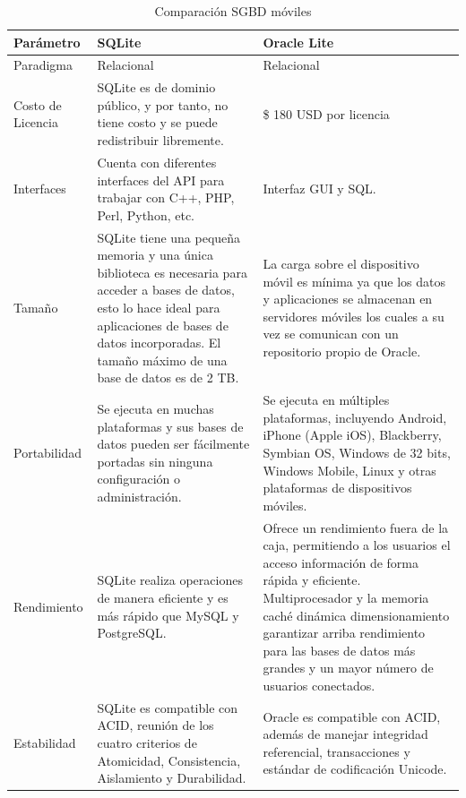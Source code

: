 \begin{table}[h!]
	\begin{center}
		\begin{tabular}{|p{3cm}|p{5.1cm}|p{5.1cm}|}
			\hline \rowcolor[RGB]{51,153,255} 
			\textcolor{blanco}{\bf Parámetro} &
				\textcolor{blanco}{\bf SQLite} &
				\textcolor{blanco}{\bf Oracle Lite} \\
			\hline 
				Paradigma &
				Relacional &
				Relacional \\
      		\hline \rowcolor[RGB]{240,248,255}
      			Costo de Licencia &
				SQLite es de dominio público, y por tanto, no tiene costo y se puede redistribuir libremente. &
				\$ 180 USD por licencia \\
      		\hline 
      			Interfaces &
				Cuenta con diferentes interfaces del API para trabajar con C++, PHP, Perl, Python, etc. &
				Interfaz GUI y SQL. \\
      		\hline \rowcolor[RGB]{240,248,255}
      			Tamaño &
				SQLite tiene una pequeña memoria y una única biblioteca es necesaria para acceder a bases de datos, esto lo hace ideal para aplicaciones de bases de datos incorporadas. El tamaño máximo de una base de datos es de 2 TB. &
				 La carga sobre el dispositivo móvil es mínima ya que los datos y aplicaciones se almacenan en servidores móviles los cuales a su vez se comunican con un repositorio propio de Oracle. \\
      		\hline 
      		Portabilidad &
      		Se ejecuta en muchas plataformas y sus bases de datos pueden ser fácilmente portadas sin ninguna configuración o administración. &
      		Se ejecuta en múltiples plataformas, incluyendo Android, iPhone (Apple iOS), Blackberry, Symbian OS, Windows de 32 bits, Windows Mobile, Linux y otras plataformas de dispositivos móviles. \\
      		\hline \rowcolor[RGB]{240,248,255}
      		Rendimiento &
      		SQLite realiza operaciones de manera eficiente y es más rápido que MySQL y PostgreSQL. &
      		Ofrece un rendimiento fuera de la caja, permitiendo a los usuarios el acceso información de forma rápida y eficiente. Multiprocesador y la memoria caché dinámica dimensionamiento garantizar arriba rendimiento para las bases de datos más grandes y un mayor número de usuarios conectados. \\ 
      		\hline 
      		Estabilidad &
      		SQLite es compatible con ACID, reunión de los cuatro criterios de Atomicidad, Consistencia, Aislamiento y Durabilidad. &
      		Oracle es compatible con ACID, además de manejar integridad referencial, transacciones y  estándar de codificación Unicode. \\
      		\hline
    		\end{tabular}
	\end{center}
	\caption[Comparación SGBD móviles]{Comparación SGBD móviles} 
	\label{tab:comSGBD}
\end{table}
